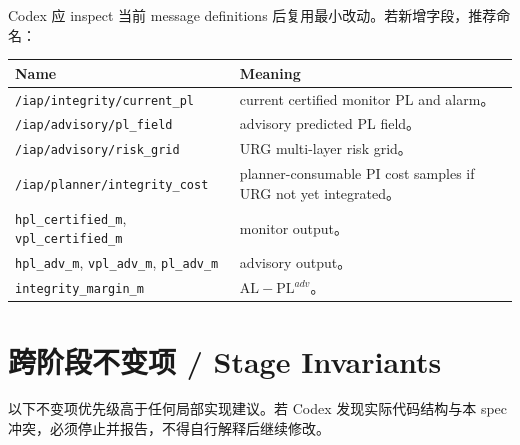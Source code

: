 \documentclass[11pt,a4paper]{article}
\newcommand{\PL}{\mathrm{PL}}
\newcommand{\AL}{\mathrm{AL}}
\begin{document}
Codex 应 inspect 当前 message definitions 后复用最小改动。若新增字段，推荐命名：
\begin{center}
\small
\begin{tabularx}{\linewidth}{lY}
  \toprule
  \textbf{Name} & \textbf{Meaning} \\
  \midrule
  \texttt{/iap/integrity/current\_pl} & current certified monitor PL and alarm。\\
  \texttt{/iap/advisory/pl\_field} & advisory predicted PL field。\\
  \texttt{/iap/advisory/risk\_grid} & URG multi-layer risk grid。\\
  \texttt{/iap/planner/integrity\_cost} & planner-consumable PI cost samples if URG not yet integrated。\\
  \texttt{hpl\_certified\_m}, \texttt{vpl\_certified\_m} & monitor output。\\
  \texttt{hpl\_adv\_m}, \texttt{vpl\_adv\_m}, \texttt{pl\_adv\_m} & advisory output。\\
  \texttt{integrity\_margin\_m} & $\AL-\PL^{adv}$。\\
  \bottomrule
\end{tabularx}
\end{center}


\section{跨阶段不变项 / Stage Invariants}
\label{sec:stage-invariants-placeholder}

以下不变项优先级高于任何局部实现建议。若 Codex 发现实际代码结构与本 spec 冲突，必须停止并报告，不得自行解释后继续修改。
\end{document}
